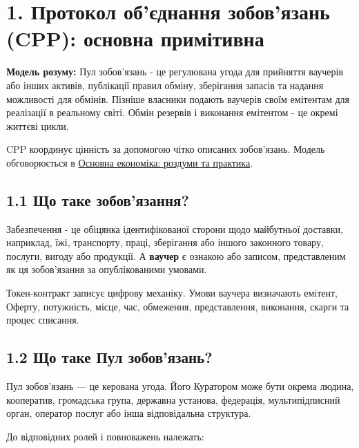 \documentclass[11pt]{article}
\begin{document}
\section*{1. Протокол об'єднання зобов'язань (CPP): основна примітивна}

\textbf{Модель розуму:} Пул зобов'язань - це регулювана угода для прийняття ваучерів або інших активів, публікації правил обміну, зберігання запасів та надання можливості для обмінів. Пізніше власники подають ваучерів своїм емітентам для реалізації в реальному світі. Обмін резервів і виконання емітентом - це окремі життєві цикли.

CPP координує цінність за допомогою чітко описаних зобов'язань. Модель обговорюється в \href{https://willruddick.substack.com/p/grassroots-economics-the-book-is}{Основна економіка: роздуми та практика}.

\subsection*{1.1 Що таке зобов'язання?}

Забезпечення - це обіцянка ідентифікованої сторони щодо майбутньої доставки, наприклад, їжі, транспорту, праці, зберігання або іншого законного товару, послуги, вигоду або продукції. А \textbf{ваучер} є ознакою або записом, представленим як ця зобов'язання за опублікованими умовами.

Токен-контракт записує цифрову механіку. Умови ваучера визначають емітент, Оферту, потужність, місце, час, обмеження, представлення, виконання, скарги та процес списання.

\subsection*{1.2 Що таке Пул зобов'язань?}

Пул зобов'язань --- це керована угода. Його Куратором може бути окрема людина, кооператив, громадська група, державна установа, федерація, мультипідписний орган, оператор послуг або інша відповідальна структура.

До відповідних ролей і повноважень належать:
\end{document}
